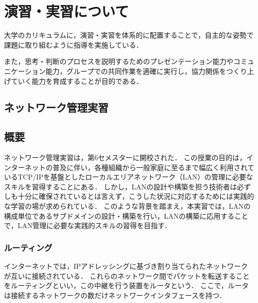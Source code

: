 \documentclass[12pt,a4j,titlepage]{ltjsarticle}
\begin{document}



\section{演習・実習について}
大学のカリキュラムに，演習・実習を体系的に配置することで，自主的な姿勢で課題に取り組むように指導を実施している．

また，思考・判断のプロセスを説明するためのプレゼンテーション能力やコミュニケーション能力，グループでの共同作業を適確に実行し，協力関係をつくり上げていく能力を育成することが目的である．

\subsection{ネットワーク管理実習}
\subsection{概要}
ネットワーク管理実習は，第6セメスターに開校された．
この授業の目的は，インターネットの普及に伴い，各種組織から一般家庭に至るまで幅広く利用されているTCP/IPを基盤としたローカルエリアネットワーク（LAN）の管理に必要なスキルを習得することにある．
しかし，LANの設計や構築を担う技術者は必ずしも十分に確保されているとは言えず，こうした状況に対応するためには実践的な学習の場が求められている．
このような背景を踏まえ，本実習では，LANの構成単位であるサブドメインの設計・構築を行い，LANの構築に応用することで，LAN管理に必要な実践的スキルの習得を目指す．

\subsubsection{ルーティング}
インターネットでは，IPアドレッシングに基づき割り当てられたネットワークが互いに接続されている．
これらのネットワーク間でパケットを転送することをルーティングといい，この中継を行う装置をルータという．
ここで，ルータは接続するネットワークの数だけネットワークインタフェースを持つ．
\end{document}
